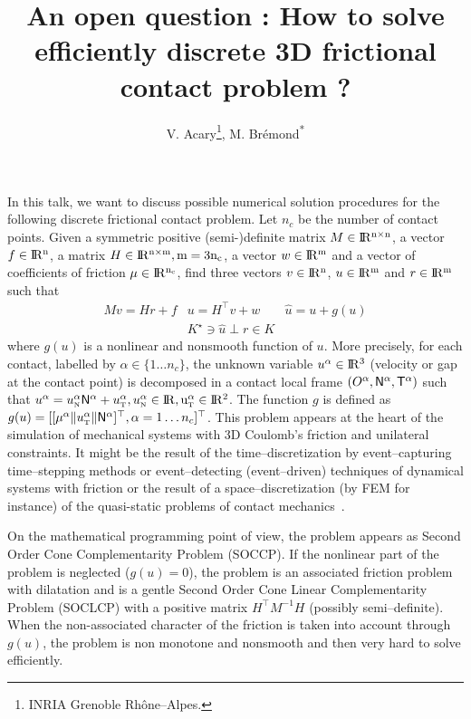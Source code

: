 \documentclass[10pt,a4paper]{article}
\title{An open question : How to solve efficiently discrete 3D frictional contact problem ?}
\author{V. Acary\thanks{INRIA Grenoble Rh\^one--Alpes.}, M. Br\'emond\textsuperscript{*}}
\newcommand{\RR}{\ensuremath{\rm I\!R}}
\def\n{{\hbox{\tiny{N}}}}
\def\t{{\hbox{\tiny{T}}}}
\begin{document}
\maketitle
In this talk, we want to discuss possible numerical solution procedures for the following discrete frictional contact problem. Let $n_c$ be the number of contact points.
  Given a symmetric positive (semi-)definite matrix ${M} \in \RR^{n \times n}$, a vector $ {f} \in \RR^n$, a matrix  ${H} \in \RR^{n \times m}, m= 3n_c$, a vector $w \in \RR^{m}$ and a vector of coefficients of friction $\mu \in \RR^{n_c}$, find three vectors $ {v} \in \RR^n$, $u\in\RR^m$ and $r\in \RR^m$ such that
\begin{equation}\label{eq:soccp1}
  \begin{array}{rcl}
    M v = {H} {r} + {f} &
    u = H^\top v + w  &
    \hat u = u + g(u) \\[1mm]
 &    K^\star \ni {\hat u} \perp r \in K&
  \end{array}
\end{equation}
where $g(u)$ is a nonlinear and nonsmooth function of $u$. More precisely, for each contact, labelled by $\alpha\in \{ 1\ldots n_c\}$,  the unknown variable  $u^\alpha\in\RR^3$ (velocity or gap at the contact point)  is decomposed  in a contact local frame $(O^\alpha,{\sf N}^\alpha,{\sf T}^\alpha)$ such that $u^\alpha = u^\alpha_{\n} {\sf N}^\alpha +   u^{\alpha}_{\t}, u^\alpha_{\n} \in \RR, u^\alpha_{\t} \in \RR^2$.
The function $g$ is defined as $g(u) = [[\mu^\alpha  \|u^\alpha_\t\| {\sf N}^\alpha]^\top, \alpha = 1\ldots n_c]^\top$.  This problem appears at the heart of the simulation of mechanical systems with 3D Coulomb's friction and unilateral constraints. It might be the result of the time--discretization by event--capturing time--stepping methods or event--detecting (event--driven) techniques of dynamical systems with friction or the result of a space--discretization (by FEM for instance) of the quasi-static problems of contact mechanics~\cite{Acary.Cadoux2013}.

 On the mathematical programming point of view, the problem appears as Second Order Cone Complementarity Problem (SOCCP). If the nonlinear part of the problem is neglected ($g(u)=0$), the problem is an associated friction problem with dilatation  and is a gentle Second Order Cone Linear Complementarity Problem (SOCLCP) with a positive matrix $H^\top M^{-1} H$ (possibly semi--definite). When the non-associated character of the friction is taken into account through $g(u)$, the problem is non monotone and nonsmooth and then very hard to solve efficiently.
\end{document}
